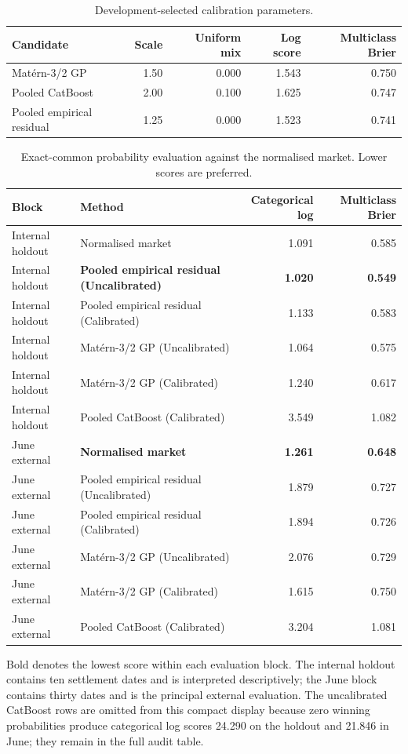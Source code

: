 \begin{table}[htbp]
\centering
\caption{Development-selected calibration parameters.}
\label{tab:calibration_selection}
\begin{tabular}{lrrrr}
\toprule
Candidate & Scale & Uniform mix & Log score & Multiclass Brier \\
\midrule
Matérn-3/2 GP & 1.50 & 0.000 & 1.543 & 0.750 \\
Pooled CatBoost & 2.00 & 0.100 & 1.625 & 0.747 \\
Pooled empirical residual & 1.25 & 0.000 & 1.523 & 0.741 \\
\bottomrule
\end{tabular}
\end{table}

\begin{table}[htbp]
\centering
\caption{Exact-common probability evaluation against the normalised market. Lower scores are preferred.}
\label{tab:probability_evaluation}
\begin{tabular}{llrr}
\toprule
Block & Method & Categorical log & Multiclass Brier \\
\midrule
Internal holdout & Normalised market & 1.091 & 0.585 \\
Internal holdout & \textbf{Pooled empirical residual (Uncalibrated)} & \textbf{1.020} & \textbf{0.549} \\
Internal holdout & Pooled empirical residual (Calibrated) & 1.133 & 0.583 \\
Internal holdout & Matérn-3/2 GP (Uncalibrated) & 1.064 & 0.575 \\
Internal holdout & Matérn-3/2 GP (Calibrated) & 1.240 & 0.617 \\
Internal holdout & Pooled CatBoost (Calibrated) & 3.549 & 1.082 \\
June external & \textbf{Normalised market} & \textbf{1.261} & \textbf{0.648} \\
June external & Pooled empirical residual (Uncalibrated) & 1.879 & 0.727 \\
June external & Pooled empirical residual (Calibrated) & 1.894 & 0.726 \\
June external & Matérn-3/2 GP (Uncalibrated) & 2.076 & 0.729 \\
June external & Matérn-3/2 GP (Calibrated) & 1.615 & 0.750 \\
June external & Pooled CatBoost (Calibrated) & 3.204 & 1.081 \\
\bottomrule
\end{tabular}
\begin{minipage}{0.94\textwidth}
\footnotesize Bold denotes the lowest score within each evaluation block. The internal holdout contains ten settlement dates and is interpreted descriptively; the June block contains thirty dates and is the principal external evaluation. The uncalibrated CatBoost rows are omitted from this compact display because zero winning probabilities produce categorical log scores 24.290 on the holdout and 21.846 in June; they remain in the full audit table.
\end{minipage}
\end{table}

